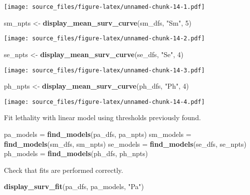 \documentclass[]{article}
\newenvironment{Shaded}{\begin{snugshade}}{\end{snugshade}}
\newcommand{\KeywordTok}[1]{\textcolor[rgb]{0.13,0.29,0.53}{\textbf{#1}}}
\newcommand{\DecValTok}[1]{\textcolor[rgb]{0.00,0.00,0.81}{#1}}
\newcommand{\StringTok}[1]{\textcolor[rgb]{0.31,0.60,0.02}{#1}}
\newcommand{\NormalTok}[1]{#1}
\begin{document}
\texttt{[image: source\_files/figure-latex/unnamed-chunk-14-1.pdf]}

\begin{Shaded}
\begin{Highlighting}[]
\NormalTok{sm_npts <-}\StringTok{ }\KeywordTok{display_mean_surv_curve}\NormalTok{(sm_dfs, }\StringTok{"Sm"}\NormalTok{, }\DecValTok{5}\NormalTok{)}
\end{Highlighting}
\end{Shaded}

\texttt{[image: source\_files/figure-latex/unnamed-chunk-14-2.pdf]}

\begin{Shaded}
\begin{Highlighting}[]
\NormalTok{se_npts <-}\StringTok{ }\KeywordTok{display_mean_surv_curve}\NormalTok{(se_dfs, }\StringTok{"Se"}\NormalTok{, }\DecValTok{4}\NormalTok{)}
\end{Highlighting}
\end{Shaded}

\texttt{[image: source\_files/figure-latex/unnamed-chunk-14-3.pdf]}

\begin{Shaded}
\begin{Highlighting}[]
\NormalTok{ph_npts <-}\StringTok{ }\KeywordTok{display_mean_surv_curve}\NormalTok{(ph_dfs, }\StringTok{"Ph"}\NormalTok{, }\DecValTok{4}\NormalTok{)}
\end{Highlighting}
\end{Shaded}

\texttt{[image: source\_files/figure-latex/unnamed-chunk-14-4.pdf]}

Fit lethality with linear model using thresholds previously found.

\begin{Shaded}
\begin{Highlighting}[]
\NormalTok{pa_models =}\StringTok{ }\KeywordTok{find_models}\NormalTok{(pa_dfs, pa_npts)}
\NormalTok{sm_models =}\StringTok{ }\KeywordTok{find_models}\NormalTok{(sm_dfs, sm_npts)}
\NormalTok{se_models =}\StringTok{ }\KeywordTok{find_models}\NormalTok{(se_dfs, se_npts)}
\NormalTok{ph_models =}\StringTok{ }\KeywordTok{find_models}\NormalTok{(ph_dfs, ph_npts)}
\end{Highlighting}
\end{Shaded}

Check that fits are performed correctly.

\begin{Shaded}
\begin{Highlighting}[]
\KeywordTok{display_surv_fit}\NormalTok{(pa_dfs, pa_models, }\StringTok{"Pa"}\NormalTok{)}
\end{Highlighting}
\end{Shaded}
\end{document}

